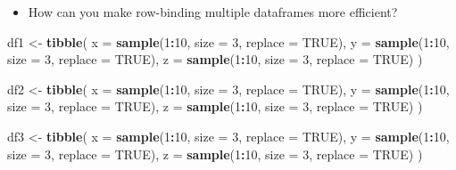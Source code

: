 \documentclass[
]{book}
\newenvironment{Shaded}{\begin{snugshade}}{\end{snugshade}}
\newcommand{\DataTypeTok}[1]{\textcolor[rgb]{0.13,0.29,0.53}{#1}}
\newcommand{\DecValTok}[1]{\textcolor[rgb]{0.00,0.00,0.81}{#1}}
\newcommand{\KeywordTok}[1]{\textcolor[rgb]{0.13,0.29,0.53}{\textbf{#1}}}
\newcommand{\NormalTok}[1]{#1}
\newcommand{\OperatorTok}[1]{\textcolor[rgb]{0.81,0.36,0.00}{\textbf{#1}}}
\newcommand{\OtherTok}[1]{\textcolor[rgb]{0.56,0.35,0.01}{#1}}
\newcommand{\StringTok}[1]{\textcolor[rgb]{0.31,0.60,0.02}{#1}}
\providecommand{\tightlist}{%
  \setlength{\itemsep}{0pt}\setlength{\parskip}{0pt}}
\begin{document}
\begin{itemize}
\tightlist
\item
  How can you make row-binding multiple dataframes more efficient?
\end{itemize}

\begin{Shaded}
\begin{Highlighting}[]
\NormalTok{df1 \textless{}{-}}\StringTok{ }\KeywordTok{tibble}\NormalTok{(}
  \DataTypeTok{x =} \KeywordTok{sample}\NormalTok{(}\DecValTok{1}\OperatorTok{:}\DecValTok{10}\NormalTok{, }\DataTypeTok{size =} \DecValTok{3}\NormalTok{, }\DataTypeTok{replace =} \OtherTok{TRUE}\NormalTok{),}
  \DataTypeTok{y =} \KeywordTok{sample}\NormalTok{(}\DecValTok{1}\OperatorTok{:}\DecValTok{10}\NormalTok{, }\DataTypeTok{size =} \DecValTok{3}\NormalTok{, }\DataTypeTok{replace =} \OtherTok{TRUE}\NormalTok{),}
  \DataTypeTok{z =} \KeywordTok{sample}\NormalTok{(}\DecValTok{1}\OperatorTok{:}\DecValTok{10}\NormalTok{, }\DataTypeTok{size =} \DecValTok{3}\NormalTok{, }\DataTypeTok{replace =} \OtherTok{TRUE}\NormalTok{)}
\NormalTok{)}

\NormalTok{df2 \textless{}{-}}\StringTok{ }\KeywordTok{tibble}\NormalTok{(}
  \DataTypeTok{x =} \KeywordTok{sample}\NormalTok{(}\DecValTok{1}\OperatorTok{:}\DecValTok{10}\NormalTok{, }\DataTypeTok{size =} \DecValTok{3}\NormalTok{, }\DataTypeTok{replace =} \OtherTok{TRUE}\NormalTok{),}
  \DataTypeTok{y =} \KeywordTok{sample}\NormalTok{(}\DecValTok{1}\OperatorTok{:}\DecValTok{10}\NormalTok{, }\DataTypeTok{size =} \DecValTok{3}\NormalTok{, }\DataTypeTok{replace =} \OtherTok{TRUE}\NormalTok{),}
  \DataTypeTok{z =} \KeywordTok{sample}\NormalTok{(}\DecValTok{1}\OperatorTok{:}\DecValTok{10}\NormalTok{, }\DataTypeTok{size =} \DecValTok{3}\NormalTok{, }\DataTypeTok{replace =} \OtherTok{TRUE}\NormalTok{)}
\NormalTok{)}

\NormalTok{df3 \textless{}{-}}\StringTok{ }\KeywordTok{tibble}\NormalTok{(}
  \DataTypeTok{x =} \KeywordTok{sample}\NormalTok{(}\DecValTok{1}\OperatorTok{:}\DecValTok{10}\NormalTok{, }\DataTypeTok{size =} \DecValTok{3}\NormalTok{, }\DataTypeTok{replace =} \OtherTok{TRUE}\NormalTok{),}
  \DataTypeTok{y =} \KeywordTok{sample}\NormalTok{(}\DecValTok{1}\OperatorTok{:}\DecValTok{10}\NormalTok{, }\DataTypeTok{size =} \DecValTok{3}\NormalTok{, }\DataTypeTok{replace =} \OtherTok{TRUE}\NormalTok{),}
  \DataTypeTok{z =} \KeywordTok{sample}\NormalTok{(}\DecValTok{1}\OperatorTok{:}\DecValTok{10}\NormalTok{, }\DataTypeTok{size =} \DecValTok{3}\NormalTok{, }\DataTypeTok{replace =} \OtherTok{TRUE}\NormalTok{)}
\NormalTok{)}
\end{Highlighting}
\end{Shaded}
\end{document}
